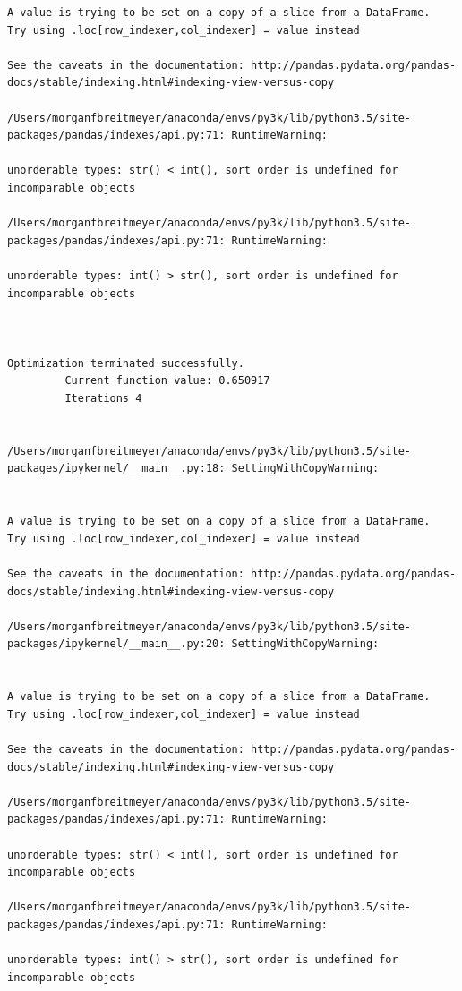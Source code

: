 \begin{lstlisting}
A value is trying to be set on a copy of a slice from a DataFrame.
Try using .loc[row_indexer,col_indexer] = value instead

See the caveats in the documentation: http://pandas.pydata.org/pandas-docs/stable/indexing.html#indexing-view-versus-copy

/Users/morganfbreitmeyer/anaconda/envs/py3k/lib/python3.5/site-packages/pandas/indexes/api.py:71: RuntimeWarning:

unorderable types: str() < int(), sort order is undefined for incomparable objects

/Users/morganfbreitmeyer/anaconda/envs/py3k/lib/python3.5/site-packages/pandas/indexes/api.py:71: RuntimeWarning:

unorderable types: int() > str(), sort order is undefined for incomparable objects



Optimization terminated successfully.
         Current function value: 0.650917
         Iterations 4


/Users/morganfbreitmeyer/anaconda/envs/py3k/lib/python3.5/site-packages/ipykernel/__main__.py:18: SettingWithCopyWarning:


A value is trying to be set on a copy of a slice from a DataFrame.
Try using .loc[row_indexer,col_indexer] = value instead

See the caveats in the documentation: http://pandas.pydata.org/pandas-docs/stable/indexing.html#indexing-view-versus-copy

/Users/morganfbreitmeyer/anaconda/envs/py3k/lib/python3.5/site-packages/ipykernel/__main__.py:20: SettingWithCopyWarning:


A value is trying to be set on a copy of a slice from a DataFrame.
Try using .loc[row_indexer,col_indexer] = value instead

See the caveats in the documentation: http://pandas.pydata.org/pandas-docs/stable/indexing.html#indexing-view-versus-copy

/Users/morganfbreitmeyer/anaconda/envs/py3k/lib/python3.5/site-packages/pandas/indexes/api.py:71: RuntimeWarning:

unorderable types: str() < int(), sort order is undefined for incomparable objects

/Users/morganfbreitmeyer/anaconda/envs/py3k/lib/python3.5/site-packages/pandas/indexes/api.py:71: RuntimeWarning:

unorderable types: int() > str(), sort order is undefined for incomparable objects




\end{lstlisting}
